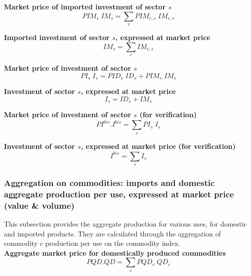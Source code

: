 \documentclass[12pt]{article}
\numberwithin{equation}{section}
\begin{document}
\noindent\textbf{Market price of imported investment of sector $s$} \\
\begin{dmath}
PIM_{s} \; IM_{s} = \sum_{c} PIM_{c, s} \; IM_{c, s}
\end{dmath}

\noindent\textbf{Imported investment of sector $s$, expressed at market price} \\
\begin{dmath}
IM_{s} = \sum_{c} IM_{c, s}
\end{dmath}

\noindent\textbf{Market price of investment of sector $s$} \\
\begin{dmath}
PI_{s} \; I_{s} = PID_{s} \; ID_{s} + PIM_{s} \; IM_{s}
\end{dmath}

\noindent\textbf{Investment of sector $s$, expressed at market price} \\
\begin{dmath}
I_{s} = ID_{s} + IM_{s}
\end{dmath}

\noindent\textbf{Market price of investment of sector $s$ (for verification)} \\
\begin{dmath}
PI^{bis} . I^{bis} = \sum_{s} PI_{s} \; I_{s}
\end{dmath}

\noindent\textbf{Investment of sector $s$, expressed at market price (for verification)} \\
\begin{dmath}
I^{bis} = \sum_{s} I_{s}
\end{dmath}



\subsubsection{Aggregation on commodities: imports and domestic aggregate production per use, expressed at market price (value \& volume)}


This subsection provides the aggregate production for various uses, for domestic and imported products. They are calculated through the aggregation of commodity $c$ production per use on the commodity index. \\

\noindent\textbf{Aggregate market price for domestically produced commodities} \\
\begin{dmath}
PQD . QD = \sum_{c} PQD_{c} \; QD_{c}
\end{dmath}
\end{document}
